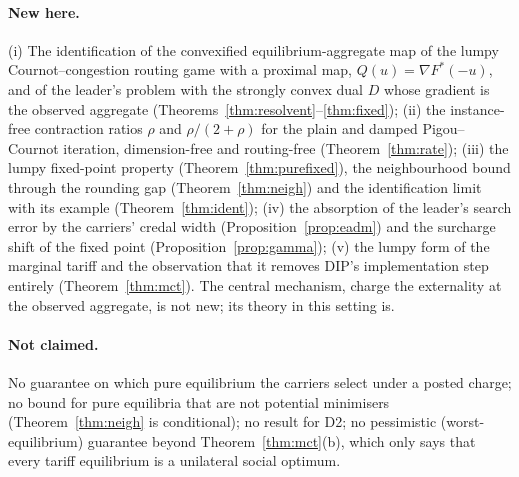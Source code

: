 \documentclass[11pt]{article}
\theoremstyle{definition}
\theoremstyle{remark}
\begin{document}
\paragraph{New here.} (i) The identification of the convexified equilibrium-aggregate map of the lumpy Cournot--congestion routing game with a proximal map, $Q(u)=\nabla F^*(-u)$, and of the leader's problem with the strongly convex dual $D$ whose gradient is the observed aggregate (Theorems~\ref{thm:resolvent}--\ref{thm:fixed}); (ii) the instance-free contraction ratios $\rho$ and $\rho/(2+\rho)$ for the plain and damped Pigou--Cournot iteration, dimension-free and routing-free (Theorem~\ref{thm:rate}); (iii) the lumpy fixed-point property (Theorem~\ref{thm:purefixed}), the neighbourhood bound through the rounding gap (Theorem~\ref{thm:neigh}) and the identification limit with its example (Theorem~\ref{thm:ident}); (iv) the absorption of the leader's search error by the carriers' credal width (Proposition~\ref{prop:eadm}) and the surcharge shift of the fixed point (Proposition~\ref{prop:gamma}); (v) the lumpy form of the marginal tariff and the observation that it removes DIP's implementation step entirely (Theorem~\ref{thm:mct}). The central mechanism, charge the externality at the observed aggregate, is not new; its theory in this setting is.

\paragraph{Not claimed.} No guarantee on which pure equilibrium the carriers select under a posted charge; no bound for pure equilibria that are not potential minimisers (Theorem~\ref{thm:neigh} is conditional); no result for D2; no pessimistic (worst-equilibrium) guarantee beyond Theorem~\ref{thm:mct}(b), which only says that every tariff equilibrium is a unilateral social optimum.
\end{document}

